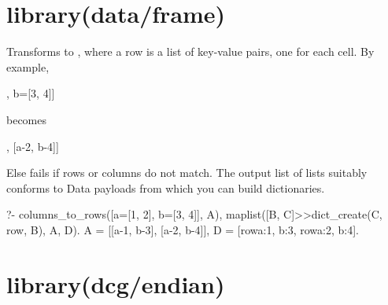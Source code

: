 \chapter{library(data/frame)}\label{sec:frame}

\begin{description}
Transforms  to , where a row is a list of
key-value pairs, one for each cell. By example,

\begin{code}
[a=[1, 2], b=[3, 4]]
\end{code}

becomes

\begin{code}
[[a-1, b-3], [a-2, b-4]]
\end{code}

Else fails if rows or columns do not match. The output list of lists
suitably conforms to  Data payloads from which you can
build dictionaries.

\begin{code}
?- columns_to_rows([a=[1, 2], b=[3, 4]], A),
   maplist([B, C]>>dict_create(C, row, B), A, D).
A = [[a-1, b-3], [a-2, b-4]],
D = [row{a:1, b:3}, row{a:2, b:4}].
\end{code}

\end{description}

\chapter{library(dcg/endian)}\label{sec:endian}

